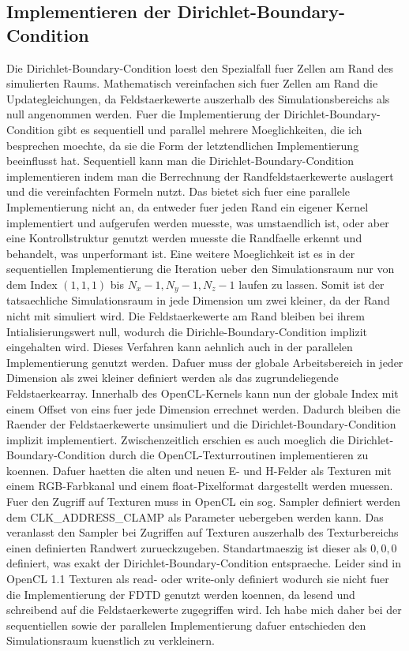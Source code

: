 \documentclass[11pt, ngerman]{article}
\begin{document}
\subsection{Implementieren der Dirichlet-Boundary-Condition}
Die Dirichlet-Boundary-Condition loest den Spezialfall fuer Zellen am Rand
des simulierten Raums. Mathematisch vereinfachen sich fuer Zellen am Rand die
Updategleichungen, da Feldstaerkewerte auszerhalb des Simulationsbereichs
als null angenommen werden. Fuer die Implementierung der Dirichlet-Boundary-Condition
gibt es sequentiell und parallel mehrere Moeglichkeiten, die ich besprechen moechte, da sie die
Form der letztendlichen Implementierung beeinflusst hat.
Sequentiell kann man die Dirichlet-Boundary-Condition implementieren indem man die Berrechnung
der Randfeldstaerkewerte auslagert und die vereinfachten Formeln nutzt. Das bietet sich
fuer eine parallele Implementierung nicht an, da entweder fuer jeden Rand ein eigener Kernel
implementiert und aufgerufen werden muesste, was umstaendlich ist, oder aber eine Kontrollstruktur
genutzt werden muesste die Randfaelle erkennt und behandelt, was unperformant ist.
Eine weitere Moeglichkeit ist es in der sequentiellen Implementierung die Iteration ueber
den Simulationsraum nur von dem Index \((1, 1, 1)\) bis \(N_x - 1, N_y - 1, N_z - 1\)
laufen zu lassen. Somit ist der tatsaechliche Simulationsraum in jede Dimension um zwei kleiner,
da der Rand nicht mit simuliert wird. Die Feldstaerkewerte am Rand bleiben bei ihrem Intialisierungswert
null, wodurch die Dirichle-Boundary-Condition implizit eingehalten wird.
Dieses Verfahren kann aehnlich auch in der parallelen Implementierung genutzt werden.
Dafuer muss der globale Arbeitsbereich in jeder Dimension als zwei kleiner definiert werden als
das zugrundeliegende Feldstaerkearray. Innerhalb des OpenCL-Kernels kann nun der globale Index
mit einem Offset von eins fuer jede Dimension errechnet werden. Dadurch bleiben die Raender der
Feldstaerkewerte unsimuliert und die Dirichlet-Boundary-Condition implizit implementiert.
Zwischenzeitlich erschien es auch moeglich die Dirichlet-Boundary-Condition durch die
OpenCL-Texturroutinen implementieren zu koennen. Dafuer haetten die alten und neuen E- und H-Felder
als Texturen mit einem RGB-Farbkanal und einem float-Pixelformat dargestellt werden muessen.
Fuer den Zugriff auf Texturen muss in OpenCL ein sog. Sampler definiert werden
dem CLK\_ADDRESS\_CLAMP als Parameter uebergeben werden kann. Das veranlasst den Sampler
bei Zugriffen auf Texturen auszerhalb des Texturbereichs einen definierten Randwert zurueckzugeben.
Standartmaeszig ist dieser als \(0, 0, 0\) definiert, was exakt der Dirichlet-Boundary-Condition
entspraeche. Leider sind in OpenCL 1.1 Texturen als read- oder write-only definiert
wodurch sie nicht fuer die Implementierung der FDTD genutzt werden koennen, da lesend und schreibend
auf die Feldstaerkewerte zugegriffen wird. Ich habe mich daher bei der sequentiellen sowie der
parallelen Implementierung dafuer entschieden den Simulationsraum kuenstlich zu verkleinern.
\end{document}
